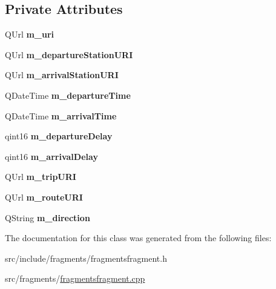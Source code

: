 \subsection*{Private Attributes}
\begin{DoxyCompactItemize}
\item 
\mbox{\label{classFragments_1_1Fragment_a5e60c2e6902a55c1e2a3bb7a97d390f5}} 
Q\+Url {\bfseries m\+\_\+uri}
\item 
\mbox{\label{classFragments_1_1Fragment_ad283a69630de2d45564976d8f4f20494}} 
Q\+Url {\bfseries m\+\_\+departure\+Station\+U\+RI}
\item 
\mbox{\label{classFragments_1_1Fragment_ae7965d7528238e79ad22fd5f07666913}} 
Q\+Url {\bfseries m\+\_\+arrival\+Station\+U\+RI}
\item 
\mbox{\label{classFragments_1_1Fragment_a0e8fdc91c05e8770524e5069e63a1c8d}} 
Q\+Date\+Time {\bfseries m\+\_\+departure\+Time}
\item 
\mbox{\label{classFragments_1_1Fragment_ae9a5e9389dbe68090f9b14a73cf6ec32}} 
Q\+Date\+Time {\bfseries m\+\_\+arrival\+Time}
\item 
\mbox{\label{classFragments_1_1Fragment_a4191e1af11c31f3b6e87ec860e2a51e1}} 
qint16 {\bfseries m\+\_\+departure\+Delay}
\item 
\mbox{\label{classFragments_1_1Fragment_ab73eb5dd910919a3b74da379489ab51e}} 
qint16 {\bfseries m\+\_\+arrival\+Delay}
\item 
\mbox{\label{classFragments_1_1Fragment_abd0750b77264363fe0069764fd7aeb3c}} 
Q\+Url {\bfseries m\+\_\+trip\+U\+RI}
\item 
\mbox{\label{classFragments_1_1Fragment_a7540fc6c97499e59d7bc582bfc142dbb}} 
Q\+Url {\bfseries m\+\_\+route\+U\+RI}
\item 
\mbox{\label{classFragments_1_1Fragment_acc9b5abffc1a65636063e42943a9e529}} 
Q\+String {\bfseries m\+\_\+direction}
\end{DoxyCompactItemize}


The documentation for this class was generated from the following files\+:\begin{DoxyCompactItemize}
\item 
src/include/fragments/fragmentsfragment.\+h\item 
src/fragments/\mbox{\hyperlink{fragmentsfragment_8cpp}{fragmentsfragment.\+cpp}}\end{DoxyCompactItemize}
